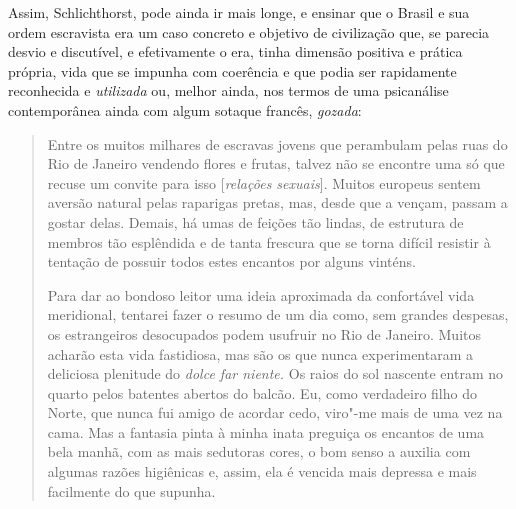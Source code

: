 Assim, Schlichthorst, pode ainda ir mais longe, e ensinar que o Brasil e
sua ordem escravista era um caso concreto e objetivo de civilização que,
se parecia desvio e discutível, e efetivamente o era, tinha dimensão
positiva e prática própria, vida que se impunha com coerência e que
podia ser rapidamente reconhecida e \emph{utilizada} ou, melhor ainda,
nos termos de uma psicanálise contemporânea ainda com algum sotaque
francês, \emph{gozada}:

\begin{quote}
Entre os muitos milhares de escravas jovens que perambulam pelas ruas
do Rio de Janeiro vendendo flores e frutas, talvez não se encontre uma
só que recuse um convite para isso {[}\emph{relações sexuais}{]}. Muitos
europeus sentem aversão natural pelas raparigas pretas, mas, desde que a
vençam, passam a gostar delas. Demais, há umas de feições tão lindas, de
estrutura de membros tão esplêndida e de tanta frescura que se torna
difícil resistir à tentação de possuir todos estes encantos por alguns
vinténs.

Para dar ao bondoso leitor uma ideia aproximada da confortável vida
meridional, tentarei fazer o resumo de um dia como, sem grandes
despesas, os estrangeiros desocupados podem usufruir no Rio de Janeiro.
Muitos acharão esta vida fastidiosa, mas são os que nunca experimentaram
a deliciosa plenitude do \emph{dolce far niente.} Os raios do sol
nascente entram no quarto pelos batentes abertos do balcão. Eu, como
verdadeiro filho do Norte, que nunca fui amigo de acordar cedo, viro"-me
mais de uma vez na cama. Mas a fantasia pinta à minha inata preguiça os
encantos de uma bela manhã, com as mais sedutoras cores, o bom senso a
auxilia com algumas razões higiênicas e, assim, ela é vencida mais
depressa e mais facilmente do que supunha.
\end{quote}

